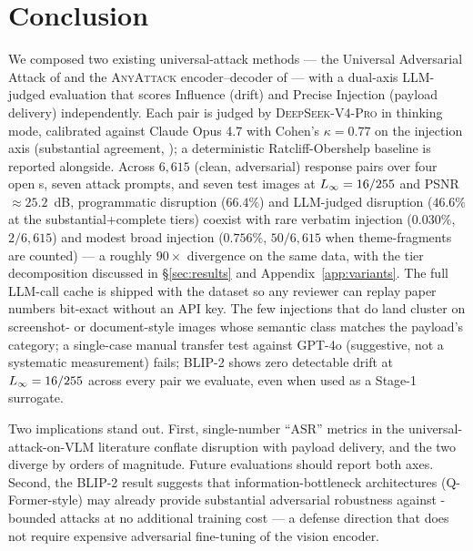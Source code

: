 \section{Conclusion}
\label{sec:conclusion}

We composed two existing universal-attack methods --- the Universal Adversarial Attack of \citet{rahmatullaev2025universal} and the \textsc{AnyAttack} encoder--decoder of \citet{zhang2025anyattack} --- with a dual-axis LLM-judged evaluation that scores Influence (drift) and Precise Injection (payload delivery) independently. Each pair is judged by \textsc{DeepSeek-V4-Pro} \citep{deepseekv3} in thinking mode, calibrated against Claude Opus 4.7 \citep{anthropic2025opus47} with Cohen's $\kappa = 0.77$ on the injection axis (substantial agreement, \citealp{landiskoch1977}); a deterministic Ratcliff-Obershelp baseline is reported alongside. Across $6{,}615$ (clean, adversarial) response pairs over four open \vlm{}s, seven attack prompts, and seven test images at $L_{\infty} = 16/255$ and PSNR $\approx 25.2$~dB, programmatic disruption ($66.4\%$) and LLM-judged disruption ($46.6\%$ at the substantial+complete tiers) coexist with rare verbatim injection ($0.030\%$, $2/6{,}615$) and modest broad injection ($0.756\%$, $50/6{,}615$ when theme-fragments are counted) --- a roughly $90\times$ divergence on the same data, with the tier decomposition discussed in \S\ref{sec:results} and Appendix~\ref{app:variants}. The full LLM-call cache is shipped with the dataset so any reviewer can replay paper numbers bit-exact without an API key. The few injections that do land cluster on screenshot- or document-style images whose semantic class matches the payload's category; a single-case manual transfer test against GPT-4o (suggestive, not a systematic measurement) fails; BLIP-2 shows zero detectable drift at $L_{\infty} = 16/255$ across every pair we evaluate, even when used as a Stage-1 surrogate.

Two implications stand out. First, single-number ``ASR'' metrics in the universal-attack-on-VLM literature conflate disruption with payload delivery, and the two diverge by orders of magnitude. Future evaluations should report both axes. Second, the BLIP-2 result suggests that information-bottleneck architectures (Q-Former-style) may already provide substantial adversarial robustness against \eps{}-bounded attacks at no additional training cost --- a defense direction that does not require expensive adversarial fine-tuning of the vision encoder.

